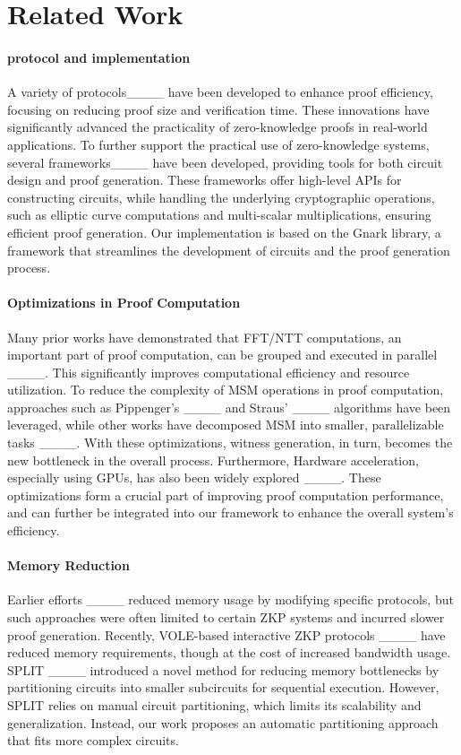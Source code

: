 \section{Related Work}
\label{sec:related_work}
\paragraph{\zk protocol and implementation}
A variety of \zk protocols____ have been developed to enhance proof efficiency, focusing on reducing proof size and verification time. These innovations have significantly advanced the practicality of zero-knowledge proofs in real-world applications. To further support the practical use of zero-knowledge systems, several frameworks____ have been developed, providing tools for both circuit design and proof generation. These frameworks offer high-level APIs for constructing circuits, while handling the underlying cryptographic operations, such as elliptic curve computations and multi-scalar multiplications, ensuring efficient proof generation. Our implementation is based on the Gnark library, a framework that streamlines the development of \zk circuits and the proof generation process.


\paragraph{Optimizations in Proof Computation}  
Many prior works have demonstrated that FFT/NTT computations, an important part of proof computation,  can be grouped and executed in parallel ____. This significantly improves computational efficiency and resource utilization. To reduce the complexity of MSM operations in proof computation, approaches such as Pippenger’s ____ and Straus’ ____ algorithms have been leveraged, while other works have decomposed MSM into smaller, parallelizable tasks ____. 
With these optimizations, witness generation, in turn, becomes the new bottleneck in the overall process.  Furthermore, Hardware acceleration, especially using GPUs, has also been widely explored ____. These optimizations form a crucial part of improving proof computation performance, and can further be integrated into our framework to enhance the overall system's efficiency.

\paragraph{Memory Reduction}  
Earlier efforts ____ reduced memory usage by modifying specific protocols, but such approaches were often limited to certain ZKP systems and incurred slower proof generation. Recently, VOLE-based interactive ZKP protocols ____ have reduced memory requirements, though at the cost of increased bandwidth usage. SPLIT ____ introduced a novel method for reducing memory bottlenecks by partitioning circuits into smaller subcircuits for sequential execution. However, SPLIT relies on manual circuit partitioning, which limits its scalability and generalization. Instead, our work proposes an automatic partitioning approach that fits more complex circuits. 


